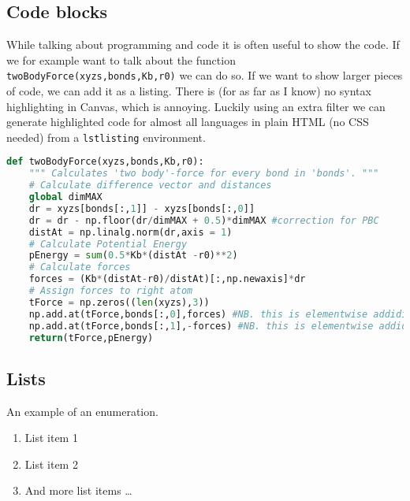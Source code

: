 \documentclass[11pt, a4paper]{article}
\begin{document}
	
	\subsection{Code blocks}
	While talking about programming and code it is often useful to show the code. If we for example want to talk about the function \lstinline{twoBodyForce(xyzs,bonds,Kb,r0)} we can do so. If we want to show larger pieces of code, we can add it as a listing. There is (for as far as I know) no syntax highlighting in Canvas, which is annoying. Luckily using an extra filter we can generate highlighted code for almost all languages in plain HTML (no CSS needed) from a \lstinline{lstlisting} environment.
	
\begin{lstlisting}[language=python]
def twoBodyForce(xyzs,bonds,Kb,r0):
	""" Calculates 'two body'-force for every bond in 'bonds'. """
	# Calculate difference vector and distances
	global dimMAX
	dr = xyzs[bonds[:,1]] - xyzs[bonds[:,0]]
	dr = dr - np.floor(dr/dimMAX + 0.5)*dimMAX #correction for PBC
	distAt = np.linalg.norm(dr,axis = 1)
	# Calculate Potential Energy
	pEnergy = sum(0.5*Kb*(distAt -r0)**2)
	# Calculate forces
	forces = (Kb*(distAt-r0)/distAt)[:,np.newaxis]*dr
	# Assign forces to right atom
	tForce = np.zeros((len(xyzs),3))
	np.add.at(tForce,bonds[:,0],forces) #NB. this is elementwise addiditon UNBUFFERED
	np.add.at(tForce,bonds[:,1],-forces) #NB. this is elementwise addiditon UNBUFFERED
	return(tForce,pEnergy)
\end{lstlisting}
	
	\subsection{Lists}
	An example of an enumeration.
	\begin{enumerate}
		\item List item 1 
		\item List item 2
		\item And more list items \ldots
	\end{enumerate}
	
\end{document}
